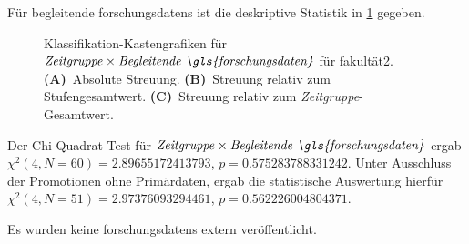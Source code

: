 Für begleitende \glspl{forschungsdaten} ist die deskriptive Statistik in \cref{fig:faculty_g_sampled_evaluated_adjusted_factors-only_Zeitgruppe_x_Begleitende.FD_absolute_boxplot} gegeben.
\begin{figure}[!htbp]
    \centering%
    \resizebox{.33\textwidth}{!}{}%
    \resizebox{.33\textwidth}{!}{}%
    \resizebox{.33\textwidth}{!}{}%
    \caption{Klassifikation-Kastengrafiken für $\text{\textit{Zeitgruppe}}\times\text{\textit{Begleitende \gls{forschungsdaten}}}$ für \gls{fakultät2}. \textbf{(A)}~Absolute Streuung. \textbf{(B)}~Streuung relativ zum Stufengesamtwert. \textbf{(C)}~Streuung relativ zum \textit{Zeitgruppe}-Gesamtwert.}
    \label{fig:faculty_g_sampled_evaluated_adjusted_factors-only_Zeitgruppe_x_Begleitende.FD_absolute_boxplot}
\end{figure} 
Der Chi-Quadrat-Test für $\text{\textit{Zeitgruppe}}\times\text{\textit{Begleitende \gls{forschungsdaten}}}$ ergab $\chi^2 (\num{4}, N = \num{60}) = \num[round-mode=places,round-precision=3]{2.89655172413793}$, $p = \num[round-mode=places,round-precision=3]{0.575283788331242}$.
Unter Ausschluss der Promotionen ohne Primärdaten, ergab die statistische Auswertung hierfür $\chi^2 (\num{4}, N = \num{51}) = \num[round-mode=places,round-precision=3]{2.97376093294461}$, $p = \num[round-mode=places,round-precision=3]{0.562226004804371}$.

Es wurden keine \glspl{forschungsdaten} extern veröffentlicht.

